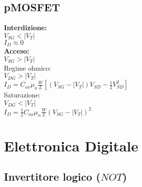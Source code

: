 \documentclass{article}
\begin{document}
\subsection*{pMOSFET}
\textbf{Interdizione:}\\
\hspace*{2cm} $V_{SG} < |V_T|$\\
\hspace*{2cm} $I_D \approx 0$\\
\textbf{Acceso:}\\
\hspace*{2cm} $V_{SG} > |V_T|$\\
\hspace*{1cm} Regime ohmico:\\
\hspace*{2cm} $V_{DG} > |V_T|$\\
\hspace*{2cm} $I_D = C_{ox} \mu_n \frac{W}{L} \left[ (V_{SG} - |V_T|)V_{SD} - \frac{1}{2}V_{SD}^2 \right]$\\
\hspace*{1cm} Saturazione:\\
\hspace*{2cm} $V_{DG} < |V_T|$\\
\hspace*{2cm} $I_D = \frac{1}{2} C_{ox} \mu_n \frac{W}{L} (V_{SG} - |V_T|)^2$

\newpage
\section*{Elettronica Digitale}

\subsection*{Invertitore logico ($NOT$)}
\end{document}
